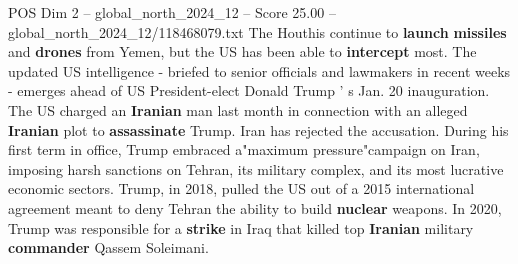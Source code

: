 \begin{textsample}{POS Dim 2 – global\_north\_2024\_12 – Score 25.00 – global\_north\_2024\_12/118468079.txt}
The Houthis continue to \textbf{launch} \textbf{missiles} and \textbf{drones} from Yemen, but the US has been able to \textbf{intercept} most.
The updated US intelligence - briefed to senior officials and lawmakers in recent weeks - emerges ahead of US President-elect Donald Trump ' s Jan. 20 inauguration.
The US charged an \textbf{Iranian} man last month in connection with an alleged \textbf{Iranian} plot to \textbf{assassinate} Trump.
Iran has rejected the accusation.
During his first term in office, Trump embraced a"maximum pressure"campaign on Iran, imposing harsh sanctions on Tehran, its military complex, and its most lucrative economic sectors.
Trump, in 2018, pulled the US out of a 2015 international agreement meant to deny Tehran the ability to build \textbf{nuclear} weapons.
In 2020, Trump was responsible for a \textbf{strike} in Iraq that killed top \textbf{Iranian} military \textbf{commander} Qassem Soleimani.

\end{textsample}
